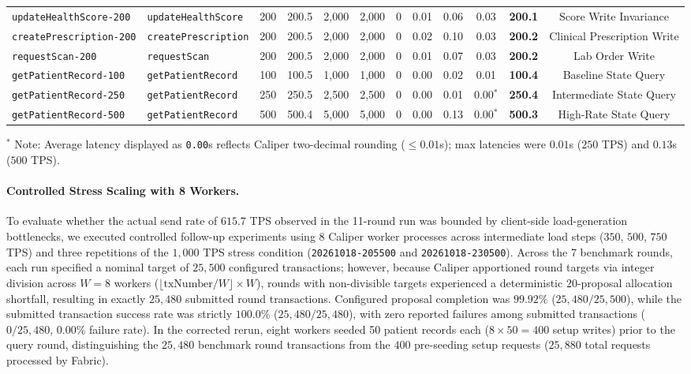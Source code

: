 \documentclass[runningheads]{llncs}
\begin{document}
\begin{table}[t]
{\begin{tabular}{llcccccccccc}
\texttt{updateHealthScore-200}    & \texttt{updateHealthScore}   & 200   & 200.5 & 2,000  & 2,000  & 0 & 0.01 & 0.06  & 0.03     & \textbf{200.1} & Score Write Invariance \\
\texttt{createPrescription-200}   & \texttt{createPrescription}  & 200   & 200.5 & 2,000  & 2,000  & 0 & 0.02 & 0.10  & 0.03     & \textbf{200.2} & Clinical Prescription Write \\
\texttt{requestScan-200}          & \texttt{requestScan}         & 200   & 200.5 & 2,000  & 2,000  & 0 & 0.01 & 0.07  & 0.03     & \textbf{200.2} & Lab Order Write \\
\texttt{getPatientRecord-100}     & \texttt{getPatientRecord}    & 100   & 100.5 & 1,000  & 1,000  & 0 & 0.00 & 0.02  & 0.01     & \textbf{100.4} & Baseline State Query \\
\texttt{getPatientRecord-250}     & \texttt{getPatientRecord}    & 250   & 250.5 & 2,500  & 2,500  & 0 & 0.00 & 0.01  & 0.00$^*$ & \textbf{250.4} & Intermediate State Query \\
\texttt{getPatientRecord-500}     & \texttt{getPatientRecord}    & 500   & 500.4 & 5,000  & 5,000  & 0 & 0.00 & 0.13  & 0.00$^*$ & \textbf{500.3} & High-Rate State Query \\
\bottomrule
\end{tabular}%
}
\vspace{1mm}
\raggedright\scriptsize{$^*$ Note: Average latency displayed as \texttt{0.00}s reflects Caliper two-decimal rounding ($\le 0.01$s); max latencies were $0.01$s ($250$ TPS) and $0.13$s ($500$ TPS).}
\end{table}

\paragraph{Controlled Stress Scaling with 8 Workers.}
To evaluate whether the actual send rate of $615.7$ TPS observed in the 11-round run was bounded by client-side load-generation bottlenecks, we executed controlled follow-up experiments using 8 Caliper worker processes across intermediate load steps ($350$, $500$, $750$ TPS) and three repetitions of the $1,000$ TPS stress condition (\texttt{20261018-205500} and \texttt{20261018-230500}). Across the 7 benchmark rounds, each run specified a nominal target of $25,500$ configured transactions; however, because Caliper apportioned round targets via integer division across $W=8$ workers ($\lfloor \text{txNumber} / W \rfloor \times W$), rounds with non-divisible targets experienced a deterministic 20-proposal allocation shortfall, resulting in exactly $25,480$ submitted round transactions. Configured proposal completion was $99.92\%$ ($25,480 / 25,500$), while the submitted transaction success rate was strictly $100.0\%$ ($25,480 / 25,480$), with zero reported failures among submitted transactions ($0/25,480$, $0.00\%$ failure rate). In the corrected rerun, eight workers seeded 50 patient records each ($8 \times 50 = 400$ setup writes) prior to the query round, distinguishing the $25,480$ benchmark round transactions from the $400$ pre-seeding setup requests ($25,880$ total requests processed by Fabric).
\end{document}
